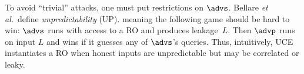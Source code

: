 {\begin{itemize}
To avoid ``trivial'' attacks, one must put restrictions on  $\advs$.  Bellare \emph{et al.}~define  \emph{unpredictability} (UP). meaning the following game should be hard to win:  $\advs$ runs with access to a RO and produces leakage~$L$. Then $\advp$ runs on input $L$ and wins if it guesses any of $\advs$'s queries. 
 Thus,  intuitively, UCE instantiates a RO  when honest inputs are unpredictable but  may be correlated or leaky. 
 







\end{itemize}}
